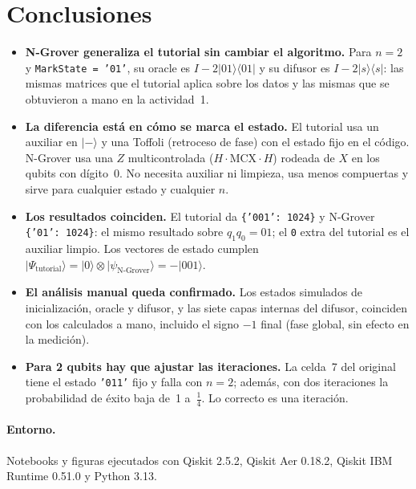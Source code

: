 \documentclass[11pt,a4paper]{article}
\providecommand{\ket}{}\renewcommand{\ket}[1]{\lvert #1\rangle}
\newcommand{\ketbra}[2]{\lvert #1\rangle\!\langle #2\rvert}
\begin{document}
\section{Conclusiones}

\begin{itemize}
\item \textbf{N-Grover generaliza el tutorial sin cambiar el algoritmo.} Para $n=2$ y \texttt{MarkState = '01'}, su oracle es
$I-2\ketbra{01}{01}$ y su difusor es $I-2\ketbra ss$: las mismas matrices que el tutorial aplica sobre los datos y las
mismas que se obtuvieron a mano en la actividad~1.
\item \textbf{La diferencia está en cómo se marca el estado.} El tutorial usa un auxiliar en $\ket-$ y una Toffoli
(retroceso de fase) con el estado fijo en el código. N-Grover usa una $Z$ multicontrolada ($H\cdot\mathrm{MCX}\cdot H$)
rodeada de $X$ en los qubits con dígito~0. No necesita auxiliar ni limpieza, usa menos compuertas y sirve para cualquier
estado y cualquier $n$.
\item \textbf{Los resultados coinciden.} El tutorial da \texttt{\{'001': 1024\}} y N-Grover \texttt{\{'01': 1024\}}: el mismo
resultado sobre $q_1q_0=01$; el \texttt{0} extra del tutorial es el auxiliar limpio. Los vectores de estado cumplen
$\ket{\Psi_{\text{tutorial}}}=\ket0\otimes\ket{\psi_{\text{N-Grover}}}=-\ket{001}$.
\item \textbf{El análisis manual queda confirmado.} Los estados simulados de inicialización, oracle y difusor, y las siete
capas internas del difusor, coinciden con los calculados a mano, incluido el signo $-1$ final (fase global, sin efecto
en la medición).
\item \textbf{Para 2 qubits hay que ajustar las iteraciones.} La celda~7 del original tiene el estado \texttt{'011'} fijo y
falla con $n=2$; además, con dos iteraciones la probabilidad de éxito baja de~1 a~$\tfrac14$. Lo correcto es una iteración.
\end{itemize}

\paragraph{Entorno.} Notebooks y figuras ejecutados con Qiskit 2.5.2, Qiskit Aer 0.18.2, Qiskit IBM Runtime 0.51.0 y Python 3.13.
\end{document}
